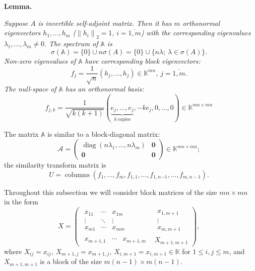 \documentclass[a4paper]{jpconf}
\begin{document}
\begin{center}
\textbf{Lemma.}
{\it
    Suppose \( A \) is invertible self-adjoint matrix.
    Then it has \( m \) orthonormal eigenvectors \( h_1, \ldots, h_m \)
    (\(\left\|h_i\right\|_2 = 1,\ i{=}\overline{1,m}\))
    with the corresponding eigenvalues
    \( \lambda_1, \ldots, \lambda_m \neq 0\).
    The spectrum of \( \mathbb{A} \) is
    \[
        \sigma(\mathbb{A}) = \{0\}\cup n\sigma(A) = \{0\} \cup \{n\lambda;\ \lambda\in\sigma(A) \}.
    \]
    Non-zero eigenvalues of \( \mathbb{A} \)
        have corresponding block eigenvectors:
    \[
        f_j = \frac{1}{\sqrt{n}} (h_j, \ldots, h_j)\in \mathbb{K}^{mn},\ j=\overline{1,m}.
    \]
    The null-space of \( \mathbb{A} \)
        has an orthonormal basis:
    \[
        f_{j,k} = \frac{1}{\sqrt{k(k+1)}}
        (
        \underbrace{e_j, \ldots, e_j}_{k\ \text{copies}},
        -ke_j,
        0, \ldots, 0
        ) \in\mathbb{K}^{{mn}{\times}{mn}}
    \]

    The matrix \( \mathbb{A} \) is similar to a block-diagonal matrix:
    \[
        \mathcal{A} =
        \left(\begin{array}{c|c}
            \operatorname{diag}(n\lambda_1,\ldots,n\lambda_m) & \mathbf{0} \\ \hline
            \mathbf{0} & \mathbf{0}
        \end{array}\right)\in\mathbb{K}^{{mn}{\times}{mn}};
    \]
    the similarity transform matrix is
    \[
        U = \operatorname{columns}
        \left(f_1, \ldots, f_m, f_{1,1}, \ldots, f_{1,n{-1}}, \ldots, f_{m,n{-}1}\right).
    \]
\/
}
\end{center}

Throughout this subsection
    we will consider block matrices
    of the size \( {mn}{\times}{mn} \)
    in the form
    \[
    X =
        \left(\begin{array}{c|c}
            \begin{matrix}
                x_{11} & \cdots & x_{1m} \\
                \vdots & \ddots & \vdots \\
                x_{m1} & \cdots & x_{mm}
            \end{matrix} &
            \begin{matrix}
                x_{1,m+1} \\
                \vdots \\
                x_{m,m+1}
            \end{matrix} \\ \hline
            \begin{matrix}
                x_{m+1,1} &
                \cdots &
                x_{m+1,m}
            \end{matrix} &
            X_{m+1,m+1}
        \end{array}\right),
    \]
where
\( X_{ij}      {=} x_{ij},
 \ X_{m{+}1,j} {=} x_{m{+}1,j},
 \ X_{i,m{+}1} {=} x_{i,m{+}1} \in \mathbb{K} \)
for \( 1 \leq {i,j} \leq m \),
and
\( X_{m{+}1,m{+}1} \) is a block of the size \( {m(n{-}1){\times}m(n-1)} \).
\end{document}
